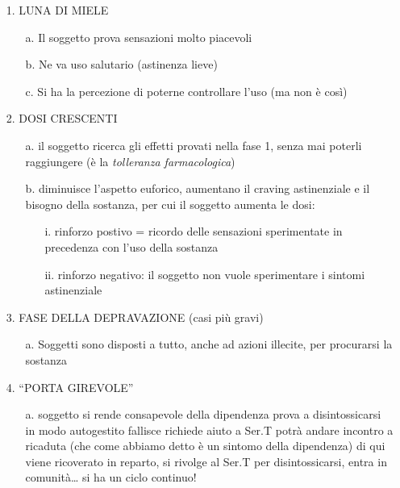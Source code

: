 \begin{itemize}
\item[1.] LUNA DI MIELE

\begin{itemize}
\item[a.]
    Il soggetto prova sensazioni molto piacevoli
  \item[b.]
    Ne va uso salutario (astinenza lieve)
  \item[c.]
    Si ha la percezione di poterne controllare l'uso (ma non è così)
\end{itemize}

\item[2.] DOSI CRESCENTI

\begin{itemize}
\item[a.]
    il soggetto ricerca gli effetti provati nella fase 1, senza mai poterli raggiungere (è la \emph{tolleranza farmacologica})
\item[b.]
    diminuisce l'aspetto euforico, aumentano il craving astinenziale e il bisogno della sostanza, per cui il soggetto aumenta le dosi:
    \begin{itemize}
    \item[i.]
      rinforzo postivo = ricordo delle sensazioni sperimentate in
      precedenza con l'uso della sostanza
    \item[ii.]
      rinforzo negativo: il soggetto non vuole sperimentare i sintomi astinenziale
    \end{itemize}
  \end{itemize}

\item[3.] FASE DELLA DEPRAVAZIONE (casi più gravi)
  
  \begin{itemize}
  \item[a.]
    Soggetti sono disposti a tutto, anche ad azioni illecite, per
    procurarsi la sostanza
  \end{itemize}
  
\item[4.] ``PORTA GIREVOLE''
 \begin{itemize}
 \item[a.]
    soggetto si rende consapevole della dipendenza  prova a
    disintossicarsi in modo autogestito fallisce richiede aiuto a
    Ser.T potrà andare incontro a ricaduta (che come abbiamo detto è un sintomo della dipendenza) di qui viene ricoverato in reparto, si rivolge al Ser.T per disintossicarsi, entra in comunità\ldots{} si ha un ciclo continuo!
  \end{itemize}
\end{itemize}

